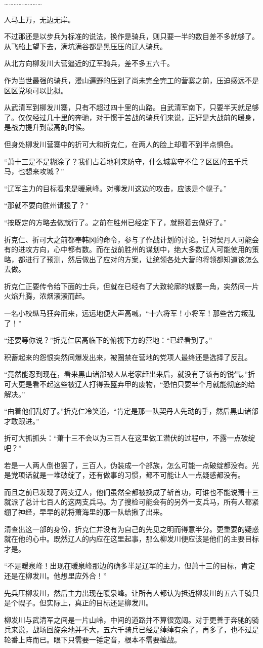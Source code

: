 ……………………

人马上万，无边无岸。

不过那还是以步兵为标准的说法，换作是骑兵，则只要一半的数目差不多就够了。从飞船上望下去，满坑满谷都是黑压压的辽人骑兵。

从北方向柳发川大营逼近的辽军骑兵，差不多五六千。

作为当世最强的骑兵，漫山遍野的压到了尚未完全完工的营寨之前，压迫感远不是区区党项可以比拟。

从武清军到柳发川寨，只有不超过四十里的山路。自武清军南下，只要半天就足够了。仅仅经过几十里的奔驰，对于惯于苦战的骑兵们来说，正好是大战前的暖身，是战力提升到最高的时候。

但身处柳发川营寨中的折可大和折克仁，在两人的脸上却看不到半点惧色。

“萧十三是不是糊涂了？我们占着地利来防守，什么城寨守不住？区区的五千兵马，也想来攻城？”

“辽军主力的目标看来是暖泉峰。对柳发川这边的攻击，应该是个幌子。”

“那就不要向胜州请援了？”

“按既定的方略去做就行了。之前在胜州已经定下了，就照着去做好了。”

折克仁、折可大之前都奉韩冈的命令，参与了作战计划的讨论。针对契丹人可能会有的进攻方向，心中都有数。而在战前胜州的谋划中，绝大多数辽人可能使用的策略，都进行了预测，然后做出了应对的方案，让统领各处大营的将领都知道该怎么去做。

折克仁正要传令给下面的士兵，但就在已经有了大致轮廓的城寨一角，突然间一片火焰升腾，浓烟滚滚而起。

一名小校纵马狂奔而来，远远地便大声高喊，“十六将军！小将军！那些苦力叛乱了！”

“还要等你说？”折克仁居高临下的俯视下方的营地：“已经看到了。”

积蓄起来的怨恨突然间爆发出来，被圈禁在营地的党项人最终还是选择了反乱。

“竟然能忍到现在，看来黑山诸部被人从老家赶出来后，就没有了该有的锐气。”折可大更是看不起这些被辽人打得丢盔弃甲的废物，“恐怕只要半个月就能彻底的给解决。”

“由着他们乱好了。”折克仁冷笑道，“肯定是那一队契丹人先动的手，然后黑山诸部才敢跟进。”

折可大抓抓头：“萧十三不会以为三百人在这里做工潜伏的过程中，不露一点破绽吧？”

若是一人两人倒也罢了，三百人，伪装成一个部族，怎么可能一点破绽都没有。光是党项话就是一堆破绽了，还有做事的习惯，都不可能让人一点疑惑都没有。

而且之前已发现了两支辽人，他们虽然全都被换成了斩首功，可谁也不能说萧十三就派了总计七百人的这两支兵马。为了搜检可能会有的另外一支兵马，所有人都紧绷了神经，早早的就将萧海里的那一队给揪了出来。

清查出这一部的身份，折克仁并没有为自己的先见之明而得意半分。更重要的疑惑就在他的心中。既然辽人的内应在这里起事，那么柳发川便应该是他们的主要目标才是。

“不是暖泉峰！出现在暖泉峰那边的确多半是辽军的主力，但萧十三的目标，肯定还是在柳发川。他想里应外合！”

先兵压柳发川，然后主力出现在暖泉峰。让所有人都认为抵近柳发川的五六千骑只是个幌子。但实际上，真正的目标还是柳发川。

柳发川与武清军之间是一片山岭，中间的道路并不算很宽阔。对于更善于奔驰的骑兵来说，战场回旋余地并不大，五六千骑兵已经是绰绰有余了，再多了，也不过是轮番上阵而已。眼下只需要一锤定音，根本不需要缠战。


